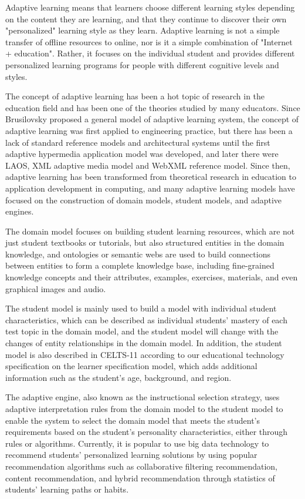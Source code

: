Adaptive learning means that learners choose different learning styles depending on the content they are learning, and that they continue to discover their own "personalized" learning style as they learn. Adaptive learning is not a simple transfer of offline resources to online, nor is it a simple combination of "Internet + education". Rather, it focuses on the individual student and provides different personalized learning programs for people with different cognitive levels and styles.

The concept of adaptive learning has been a hot topic of research in the education field and has been one of the theories studied by many educators. Since Brusilovsky proposed a general model of adaptive learning system, the concept of adaptive learning was first applied to engineering practice, but there has been a lack of standard reference models and architectural systems until the first adaptive hypermedia application model was developed, and later there were LAOS, XML adaptive media model and WebXML reference model.
Since then, adaptive learning has been transformed from theoretical research in education to application development in computing, and many adaptive learning models have focused on the construction of domain models, student models, and adaptive engines.

The domain model focuses on building student learning resources, which are not just student textbooks or tutorials, but also structured entities in the domain knowledge, and ontologies or semantic webs are used to build connections between entities to form a complete knowledge base, including fine-grained knowledge concepts and their attributes, examples, exercises, materials, and even graphical images and audio.

The student model is mainly used to build a model with individual student characteristics, which can be described as individual students' mastery of each test topic in the domain model, and the student model will change with the changes of entity relationships in the domain model. In addition, the student model is also described in CELTS-11 according to our educational technology specification on the learner specification model, which adds additional information such as the student's age, background, and region.

The adaptive engine, also known as the instructional selection strategy, uses adaptive interpretation rules from the domain model to the student model to enable the system to select the domain model that meets the student's requirements based on the student's personality characteristics, either through rules or algorithms. Currently, it is popular to use big data technology to recommend students' personalized learning solutions by using popular recommendation algorithms such as collaborative filtering recommendation, content recommendation, and hybrid recommendation through statistics of students' learning paths or habits.

